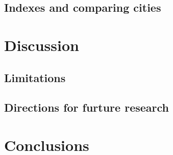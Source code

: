 \documentclass[preprint, 3p,
authoryear]{elsarticle} %
\begin{document}
\hypertarget{indexes-and-comparing-cities}{%
\subsection{Indexes and comparing
cities}\label{indexes-and-comparing-cities}}

\hypertarget{discussion}{%
\section{Discussion}\label{discussion}}

\hypertarget{limitations}{%
\subsection{Limitations}\label{limitations}}

\hypertarget{directions-for-furture-research}{%
\subsection{Directions for furture
research}\label{directions-for-furture-research}}

\hypertarget{conclusions}{%
\section{Conclusions}\label{conclusions}}

\renewcommand\refname{References}

\end{document}
